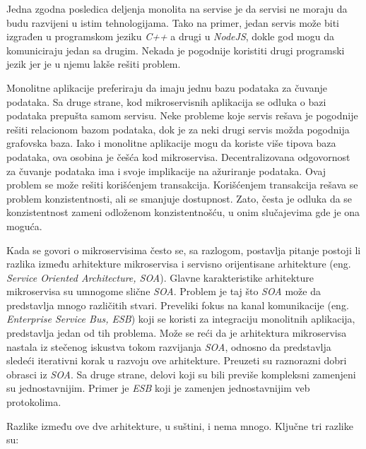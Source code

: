 Jedna zgodna posledica deljenja monolita na servise je da servisi ne moraju da budu razvijeni u istim 
tehnologijama. Tako na primer, jedan servis može biti izgrađen u programskom jeziku \textit{C++} a drugi u 
\textit{NodeJS}, dokle god mogu da komuniciraju jedan sa drugim. Nekada je pogodnije koristiti drugi programski 
jezik jer je u njemu lakše rešiti problem.

Monolitne aplikacije preferiraju da imaju jednu bazu podataka za čuvanje podataka. Sa druge strane, kod 
mikroservisnih aplikacija se odluka o bazi podataka prepušta samom servisu. Neke probleme koje servis 
rešava je pogodnije rešiti relacionom bazom podataka, dok je za neki drugi servis možda pogodnija grafovska baza.
Iako i monolitne aplikacije mogu da koriste više tipova baza podataka, ova osobina je češća kod 
mikroservisa. Decentralizovana odgovornost za čuvanje podataka ima i svoje implikacije na ažuriranje 
podataka. Ovaj problem se može rešiti korišćenjem transakcija. Korišćenjem transakcija rešava se problem 
konzistentnosti, ali se smanjuje dostupnost. Zato, česta je odluka da se konzistentnost zameni 
odloženom konzistentnošću, u onim slučajevima gde je ona moguća. 

Kada se govori o mikroservisima često se, sa razlogom, postavlja pitanje postoji li razlika između arhitekture
mikroservisa i servisno orijentisane arhitekture (eng. \textit{Service Oriented Architecture, SOA}). 
Glavne karakteristike arhitekture mikroservisa su umnogome slične \textit{SOA}. Problem je taj što \textit{SOA} 
može da predstavlja mnogo različitih stvari. Preveliki fokus na kanal komunikacije 
(eng. \textit{Enterprise Service Bus, ESB}) koji se koristi za integraciju monolitnih aplikacija, 
predstavlja jedan od tih problema. Može se reći da je arhitektura mikroservisa nastala iz stečenog iskustva tokom 
razvijanja \textit{SOA}, odnosno da predstavlja sledeći iterativni korak u razvoju ove arhitekture. 
Preuzeti su raznorazni dobri obrasci iz \textit{SOA}. Sa druge strane, delovi koji su bili previše kompleksni 
zamenjeni su jednostavnijim. Primer je \textit{ESB} koji je zamenjen jednostavnijim veb protokolima. 

Razlike između ove dve arhitekture, u suštini, i nema mnogo. Ključne tri razlike su:

